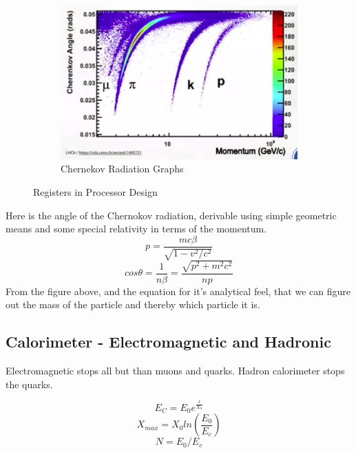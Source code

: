 \begin{figure}[H]
\begin{subfigure}[b]{0.45\textwidth}
    \includegraphics[width=\linewidth]{img/hadron/particleid-chernekov-graph.png}
    \caption{Chernekov Radiation Graphs}
  \end{subfigure}
  \label{fig:particleid-chernekov-wavefronts}
  \caption{Registers in Processor Design}
\end{figure}

Here is the angle of the Chernokov radiation, derivable using simple geometric means and some special relativity in terms of the momentum.
\begin{equation}
  p = \frac{mc\beta}{\sqrt{1 - v^2/c^2}}
\end{equation}
\begin{equation}
  cos \theta = \frac{1}{n\beta} = \frac{\sqrt{p^2 + m^2c^2}}{np}
\end{equation}
From the figure above, and the equation for it's analytical feel, that we can figure out the mass of the particle and thereby which particle it is.


\subsection{Calorimeter - Electromagnetic and Hadronic}

Electromagnetic stops all but than muons and quarks. Hadron calorimeter stops the quarks.

\begin{equation}
  E_C = E_0 e^{\frac{x}{X_0}}
\end{equation}
\begin{equation}
  X_{max} = X_0 ln(\frac{E_0}{E_c})
\end{equation}
\begin{equation}
  N = E_0 / E_c
\end{equation}


